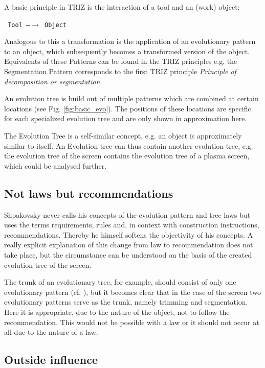 \documentclass[11pt,a4paper]{article}
\begin{document}
A basic principle in TRIZ is the interaction of a tool and an (work) object:

\begin{center}\tt
  Tool \textrm{---}$\to$ Object
\end{center}

Analogous to this a transformation is the application of an evolutionary pattern to an object, which subsequently becomes a transformed version of the object. Equivalents of these Patterns can be found in the TRIZ principles e.g. the Segmentation Pattern corresponds to the first TRIZ principle \textit{Principle of decomposition or segmentation}.

An evolution tree is build out of multiple patterns which are combined at certain locations (see Fig. \ref{fig:basic_evo}). The positions of these locations are specific for each specialized evolution tree and are only shown in approximation here. 

The Evolution Tree is a self-similar concept, e.g. an object is approximately similar to itself. An Evolution tree can thus contain another evolution tree, e.g. the evolution tree of the screen contains the evolution tree of a plasma screen, which could be analysed further.

\subsection{Not laws but recommendations}

Shpakovsky never calls his concepts of the evolution pattern and tree laws but uses the terms requirements, rules and, in context with construction instructions, recommendations. Thereby he himself softens the objectivity of his concepts. A really explicit explanation of this change from law to recommendation does not take place, but the circumstance can be understood on the basis of the created evolution tree of the screen.

The trunk of an evolutionary tree, for example, should consist of only one evolutionary pattern (cf. \cite[p. 122f]{Shpakovsky2016}), but it becomes clear that in the case of the screen two evolutionary patterns serve as the trunk, namely trimming and segmentation. Here it is appropriate, due to the nature of the object, not to follow the recommendation. This would not be possible with a law or it should not occur at all due to the nature of a law.

\subsection{Outside influence}
\end{document}
